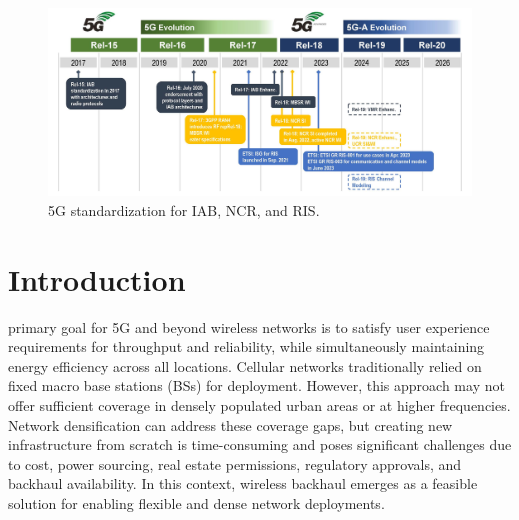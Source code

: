\documentclass[lettersize,journal]{IEEEtran}
\begin{document}

\begin{figure}[b]
\centering
\includegraphics[width=6.0in]{Figs/3GPP_Roadmap.jpg}
\caption{5G standardization for IAB, NCR, and RIS.}
\label{fig:3GPP_Roadmap}
\end{figure}


\section{Introduction}

 primary goal for 5G and beyond wireless networks is to satisfy user experience requirements for throughput and reliability, while simultaneously maintaining energy efficiency across all locations. Cellular networks traditionally relied on fixed macro base stations (BSs) for deployment. However, this approach may not offer sufficient coverage in densely populated urban areas or at higher frequencies. Network densification can address these coverage gaps, but creating new infrastructure from scratch is time-consuming and poses significant challenges due to cost, power sourcing, real estate permissions, regulatory approvals, and backhaul availability. In this context, wireless backhaul emerges as a feasible solution for enabling flexible and dense network deployments.
\end{document}
